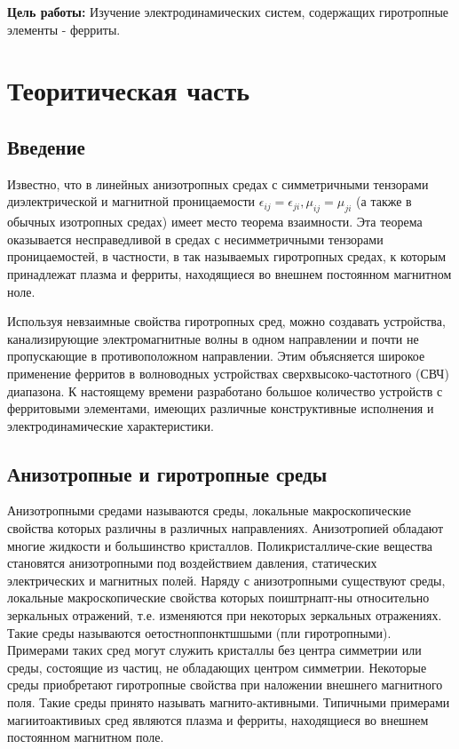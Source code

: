 
\newcommand{\vH}{\textbf{H}}
\newcommand{\vE}{\textbf{E}}
\newcommand{\vB}{\textbf{B}}
\newcommand{\vD}{\textbf{D}}
\newcommand{\vr}{\textbf{r}}
\newcommand{\vj}{\textbf{j}}
\newcommand{\vk}{\textbf{k}}
\newcommand{\vx}{\textbf{x}}
\newcommand{\vy}{\textbf{y}}
\newcommand{\vz}{\textbf{z}}


\def\labauthors{Карусевич А.А., Шиков А.П.}
\def\labgroup{440}
\def\labnumber{1}
\def\labtheme{Волноводные ферритовые устройства СВЧ диапазона}


\newpage

{\bfseries Цель работы:} 
Изучение электродинамических систем, содержащих гиротропные элементы - ферриты.

\section{Теоритическая часть}
\subsection{Введение}
Известно, что в линейных анизотропных средах с симметричными тензорами диэлектрической и магнитной проницаемости
$\epsilon_{ij} = \epsilon_{ji},\mu_{ij} = \mu_{ji}$ (а также в обычных изотропных средах) имеет место теорема взаимности. Эта теорема оказывается несправедливой в средах
с несимметричными тензорами проницаемостей, в частности, в так называемых гиротропных средах, к которым принадлежат
плазма и ферриты, находящиеся во внешнем постоянном магнитном ноле.

Используя невзаимные свойства гиротропных сред, можно создавать устройства, канализирующие электромагнитные волны в
одном направлении и почти не пропускающие в противоположном направлении. Этим объясняется широкое применение ферритов в
волноводных устройствах сверхвысоко-частотного (СВЧ) диапазона. К настоящему времени разработано большое количество
устройств с ферритовыми элементами, имеющих различные конструктивные исполнения и электродинамические характеристики.

\subsection{Анизотропные и гиротропные среды}

Анизотропными средами называются среды, локальные макроскопические свойства которых различны в различных направлениях.
Анизотропией обладают многие жидкости и большинство кристаллов. Поликристалличе-ские вещества становятся анизотропными
под воздействием давления, статических электрических и магнитных полей. Наряду с анизотропными существуют среды,
локальные макроскопические свойства которых поиштрнапт-ны относительно зеркальных отражений, т.е. изменяются при
некоторых зеркальных отражениях. Такие среды называются оетостноппонктшшыми (пли гиротропными). Примерами таких сред
могут служить кристаллы без центра симметрии или среды, состоящие из частиц, не обладающих центром симметрии. Некоторые
среды приобретают гиротропные свойства при наложении внешнего магнитного поля. Такие среды принято называть
магнито-активными. Типичными примерами магиитоактивиых сред являются плазма и ферриты, находящиеся во внешнем постоянном
магнитном поле.

